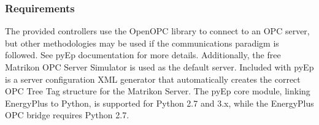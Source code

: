 \subsubsection{Requirements}

The provided controllers use the OpenOPC library to connect to an OPC server, but other methodologies may be used if the communications paradigm is followed. See pyEp documentation for more details.
Additionally, the free Matrikon OPC Server Simulator is used as the default server.
Included with pyEp is a server configuration XML generator that automatically creates the correct OPC Tree Tag structure for the Matrikon Server. 
The pyEp core module, linking EnergyPlus to Python, is supported for Python 2.7 and 3.x, while the EnergyPlus OPC bridge requires Python 2.7.
